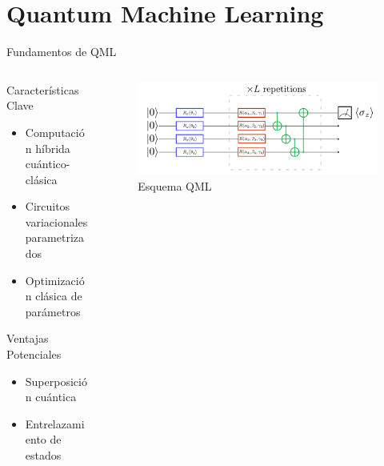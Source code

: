 \documentclass[aspectratio=43]{beamer}
\begin{document}
\section{Quantum Machine Learning}

\begin{frame}{Fundamentos de QML}
  \begin{columns}
    \begin{column}{0.5\textwidth}
      \begin{block}{Características Clave}
        \begin{itemize}
          \item Computación híbrida cuántico-clásica
          \item Circuitos variacionales parametrizados
          \item Optimización clásica de parámetros
        \end{itemize}
      \end{block}
      \begin{alertblock}{Ventajas Potenciales}
        \begin{itemize}
          \item Superposición cuántica
          \item Entrelazamiento de estados
        \end{itemize}
      \end{alertblock}
    \end{column}
    \begin{column}{0.5\textwidth}
      \begin{figure}
        \includegraphics[width=\textwidth]{angleemb.png}
        \caption{Esquema QML}
      \end{figure}
    \end{column}
  \end{columns}
\end{frame}
\end{document}
